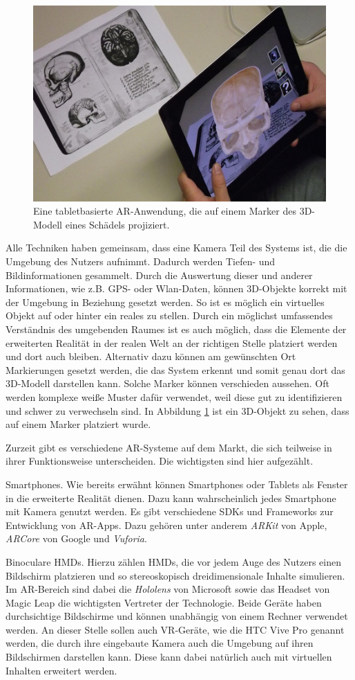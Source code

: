 \begin{figure}
	\centering
	\includegraphics[width=0.5\linewidth]{images/App_iSkull,_an_augmented_human_skull.jpg}
	\caption{Eine tabletbasierte AR-Anwendung, die auf einem Marker des 3D-Modell  eines Schädels projiziert.}
	\label{img:ARMarker}
\end{figure}

Alle Techniken haben gemeinsam, dass eine Kamera Teil des Systems ist, die die Umgebung des Nutzers aufnimmt. Dadurch werden Tiefen- und Bildinformationen gesammelt. Durch die Auswertung dieser und anderer Informationen, wie z.B. GPS- oder Wlan-Daten, können 3D-Objekte korrekt mit der Umgebung in Beziehung gesetzt werden. So ist es möglich ein virtuelles Objekt auf oder hinter ein reales zu stellen. Durch ein möglichst umfassendes Verständnis des umgebenden Raumes ist es auch möglich, dass die Elemente der erweiterten Realität in der realen Welt an der richtigen Stelle platziert werden und dort auch bleiben.
Alternativ dazu können am gewünschten Ort Markierungen gesetzt werden, die das System erkennt und somit genau dort das 3D-Modell darstellen kann. Solche Marker können verschieden aussehen. Oft werden komplexe weiße Muster dafür verwendet, weil diese gut zu identifizieren und schwer zu verwechseln sind. In Abbildung \ref{img:ARMarker} ist ein 3D-Objekt zu sehen, dass auf einem Marker platziert wurde. 

Zurzeit gibt es verschiedene AR-Systeme auf dem Markt, die sich teilweise in ihrer Funktionsweise unterscheiden. Die wichtigsten sind hier aufgezählt.

Smartphones. Wie bereits erwähnt können Smartphones oder Tablets als Fenster in die erweiterte Realität dienen. Dazu kann wahrscheinlich jedes Smartphone mit Kamera genutzt werden. Es gibt verschiedene SDKs und Frameworks zur Entwicklung von AR-Apps. Dazu gehören unter anderem \textit{ARKit} von Apple, \textit{ARCore} von Google und \textit{Vuforia}.

Binoculare HMDs. Hierzu zählen HMDs, die vor jedem Auge des Nutzers einen Bildschirm platzieren und so stereoskopisch dreidimensionale Inhalte simulieren. Im AR-Bereich sind dabei die \textit{Hololens} von Microsoft sowie das Headset von Magic Leap die wichtigsten Vertreter der Technologie. Beide Geräte haben durchsichtige Bildschirme und können unabhängig von einem Rechner verwendet werden. 
An dieser Stelle sollen auch VR-Geräte, wie die HTC Vive Pro genannt werden, die durch ihre eingebaute Kamera auch die Umgebung auf ihren Bildschirmen darstellen kann. Diese kann dabei natürlich auch mit virtuellen Inhalten erweitert werden. 

